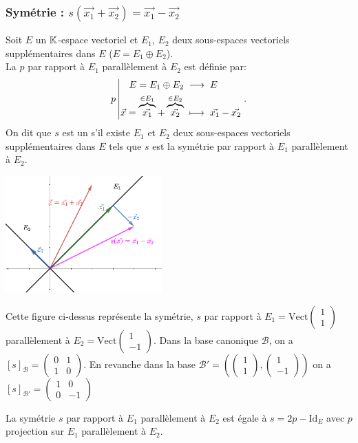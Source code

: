 \documentclass{book}
\begin{document}
\subsubsection{Symétrie : $s(\vec{x_1} + \vec{x_2})=\vec{x_1}-\vec{x_2}$}
\begin{Definition}[Projecteur]
 Soit $E$ un $\mathbb{K} $-espace vectoriel et $E_1$, $E_2$ deux sous-espaces vectoriels supplémentaires dans $E$  ($E = E_1 \oplus E_2$).\\
La  $p$ par rapport à $E_1$ parallèlement à $E_2$ est définie par:
$${p}\left|\begin{aligned}{ E = E_1 \oplus E_2 }&\;\longrightarrow\;{ E}\\{\vec{x} = \overbrace{\vec{x_1}}^{\in E_1} + \overbrace{\vec{x_2}}^{\in E_2}}&\;\longmapsto\;{\vec{x_1}-\vec{x_2}}\end{aligned}\right..$$
On dit que $s$ est un  s'il existe $E_1$ et $E_2$ deux sous-espaces vectoriels supplémentaires dans $E$ tels que
$s$ est la symétrie  par rapport à $E_1$ parallèlement à $E_2$.
\end{Definition}
\begin{Exemple}
\begin{center}
\includegraphics[width=6cm]{symetrie.png}
\end{center}
Cette figure ci-dessus représente la symétrie, $s$ par rapport à $E_1=\mathrm{Vect}\begin{pmatrix}
1\\1
\end{pmatrix}$ parallèlement à $E_2=\mathrm{Vect}\begin{pmatrix}1\\-1
\end{pmatrix}$.  Dans la base canonique $\mathcal{B}$, on a $[s]_\mathcal{B}=\begin{pmatrix}0&1\\1&0\end{pmatrix}$. En revanche dans la base  $\mathcal{B}'=\left(\begin{pmatrix}
1\\1
\end{pmatrix},\begin{pmatrix}1\\-1
\end{pmatrix}\right) $ on a $[s]_{\mathcal{B}'}=\begin{pmatrix}1&0\\0&-1\end{pmatrix}$
\end{Exemple}
\begin{Proposition} 
La symétrie $s$ par rapport à $E_1$ parallèlement à $E_2$ est égale à $s=2p-\mathrm{Id}_E$ avec $p$ projection sur $E_1$ parallèlement à $E_2$.
\end{Proposition}
\end{document}
